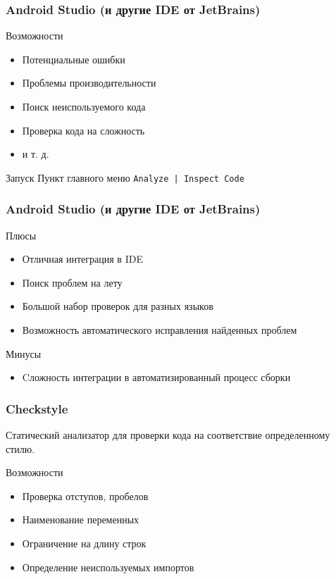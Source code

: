 \documentclass{beamer}
\begin{document}
\begin{frame}
    \frametitle{Android Studio (и другие IDE от JetBrains)}
    \begin{block}{Возможности}
        \begin{itemize}
            \item{Потенциальные ошибки}
            \item{Проблемы производительности}
            \item{Поиск неиспользуемого кода}
            \item{Проверка кода на сложность}
            \item{и т. д.}
        \end{itemize}
    \end{block}
    \begin{block}{Запуск}
        Пункт главного меню \texttt{Analyze | Inspect Code}
    \end{block}
\end{frame}
\begin{frame}
    \frametitle{Android Studio (и другие IDE от JetBrains)}
    \begin{block}{Плюсы}
        \begin{itemize}
            \item{Отличная интеграция в IDE}
            \item{Поиск проблем на лету}
            \item{Большой набор проверок для разных языков}
            \item{Возможность автоматического исправления найденных проблем}
        \end{itemize}
    \end{block}
    \begin{block}{Минусы}
        \begin{itemize}
            \item{Cложность интеграции в автоматизированный процесс сборки}
        \end{itemize}
    \end{block}
\end{frame}

\begin{frame}
    \frametitle{Checkstyle}
    Статический анализатор для проверки кода на соответствие определенному стилю.
    \begin{block}{Возможности}
        \begin{itemize}
            \item{Проверка отступов, пробелов}
            \item{Наименование переменных}
            \item{Ограничение на длину строк}
            \item{Определение неиспользуемых импортов}
        \end{itemize}
    \end{block}
\end{frame}
\end{document}
